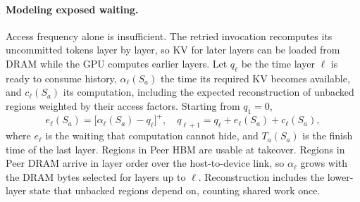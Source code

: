 \paragraph{Modeling exposed waiting.}
Access frequency alone is insufficient. The retried invocation
recomputes its uncommitted tokens layer by layer, so KV for later layers
can be loaded from DRAM while the GPU computes earlier layers. Let
$q_\ell$ be the time layer $\ell$ is ready to consume history,
$\alpha_\ell(S_a)$ the time its required KV becomes available, and
$c_\ell(S_a)$ its computation, including the expected reconstruction of
unbacked regions weighted by their access factors. Starting from
$q_1=0$,
\begin{equation}
 e_\ell(S_a)=\bigl[\alpha_\ell(S_a)-q_\ell\bigr]^+,\quad
 q_{\ell+1}=q_\ell+e_\ell(S_a)+c_\ell(S_a),
 \label{eq:overlap}
\end{equation}
where $e_\ell$ is the waiting that computation cannot hide, and
$T_a(S_a)$ is the finish time of the last layer. Regions in Peer HBM are
usable at takeover. Regions in Peer DRAM arrive in layer order over the
host-to-device link, so $\alpha_\ell$ grows with the DRAM bytes selected
for layers up to $\ell$. Reconstruction includes the lower-layer state
that unbacked regions depend on, counting shared work once.

